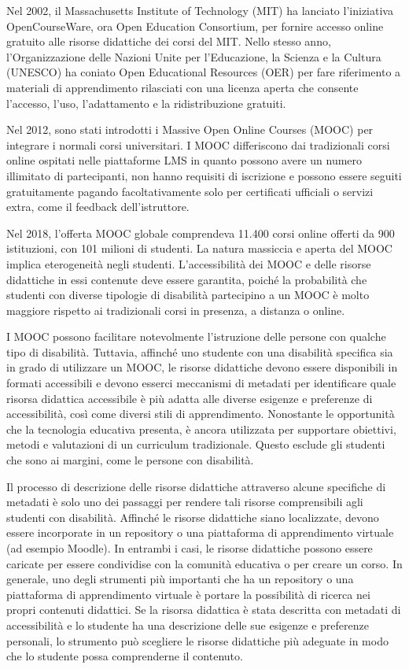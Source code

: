 Nel 2002, il Massachusetts Institute of Technology (MIT) ha lanciato l'iniziativa OpenCourseWare, ora Open Education Consortium, per fornire accesso online gratuito alle risorse didattiche dei corsi del MIT. Nello stesso anno, l'Organizzazione delle Nazioni Unite per l'Educazione, la Scienza e la Cultura (UNESCO) ha coniato Open Educational Resources (OER) per fare riferimento a materiali di apprendimento rilasciati con una licenza aperta che consente l'accesso, l'uso, l'adattamento e la ridistribuzione gratuiti.

Nel 2012, sono stati introdotti i Massive Open Online Courses (MOOC) per integrare i normali corsi universitari. I MOOC differiscono dai tradizionali corsi online ospitati nelle piattaforme LMS in quanto possono avere un numero illimitato di partecipanti, non hanno requisiti di iscrizione e possono essere seguiti gratuitamente pagando facoltativamente solo per certificati ufficiali o servizi extra, come il feedback dell'istruttore.

Nel 2018, l'offerta MOOC globale comprendeva 11.400 corsi online offerti da 900 istituzioni, con 101 milioni di studenti. La natura massiccia e aperta del MOOC implica eterogeneità negli studenti. L'accessibilità dei MOOC e delle risorse didattiche in essi contenute deve essere garantita, poiché la probabilità che studenti con diverse tipologie di disabilità partecipino a un MOOC è molto maggiore rispetto ai tradizionali corsi in presenza, a distanza o online. 

I MOOC possono facilitare notevolmente l'istruzione delle persone con qualche tipo di disabilità. Tuttavia, affinché uno studente con una disabilità specifica sia in grado di utilizzare un MOOC, le risorse didattiche devono essere disponibili in formati accessibili e devono esserci meccanismi di metadati per identificare quale risorsa didattica accessibile è più adatta alle diverse esigenze e preferenze di accessibilità, così come diversi stili di apprendimento. Nonostante le opportunità che la tecnologia educativa presenta, è ancora utilizzata per supportare obiettivi, metodi e valutazioni di un curriculum tradizionale. Questo esclude gli studenti che sono ai margini, come le persone con disabilità.

Il processo di descrizione delle risorse didattiche attraverso alcune specifiche di metadati è solo uno dei passaggi per rendere tali risorse comprensibili agli studenti con disabilità. Affinché le risorse didattiche siano localizzate, devono essere incorporate in un repository o una piattaforma di apprendimento virtuale (ad esempio Moodle). In entrambi i casi, le risorse didattiche possono essere caricate per essere condividise con la comunità educativa o per creare un corso. In generale, uno degli strumenti più importanti che ha un repository o una piattaforma di apprendimento virtuale è portare la possibilità di ricerca nei propri contenuti didattici. Se la risorsa didattica è stata descritta con metadati di accessibilità e lo studente ha una descrizione delle sue esigenze e preferenze personali, lo strumento può scegliere le risorse didattiche più adeguate in modo che lo studente possa comprenderne il contenuto.

